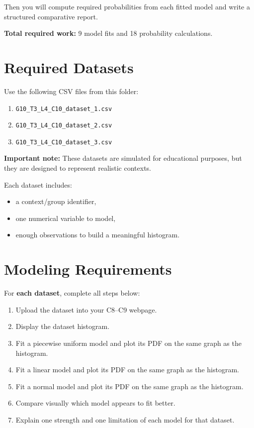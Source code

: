 	Then you will compute required probabilities from each fitted model and write a structured comparative report.
	
	\textbf{Total required work:} 9 model fits and 18 probability calculations.

	\section{Required Datasets}
	Use the following CSV files from this folder:
	\begin{enumerate}
		\item \texttt{G10\_T3\_L4\_C10\_dataset\_1.csv}
		\item \texttt{G10\_T3\_L4\_C10\_dataset\_2.csv}
		\item \texttt{G10\_T3\_L4\_C10\_dataset\_3.csv}
	\end{enumerate}
	
	\textbf{Important note:} These datasets are simulated for educational purposes, but they are designed to represent realistic contexts.
	
	Each dataset includes:
	\begin{itemize}
		\item a context/group identifier,
		\item one numerical variable to model,
		\item enough observations to build a meaningful histogram.
	\end{itemize}

	\section{Modeling Requirements}
	For \textbf{each dataset}, complete all steps below:
	\begin{enumerate}
		\item Upload the dataset into your C8--C9 webpage.
		\item Display the dataset histogram.
		\item Fit a piecewise uniform model and plot its PDF on the same graph as the histogram.
		\item Fit a linear model and plot its PDF on the same graph as the histogram.
		\item Fit a normal model and plot its PDF on the same graph as the histogram.
		\item Compare visually which model appears to fit better.
		\item Explain one strength and one limitation of each model for that dataset.
	\end{enumerate}

